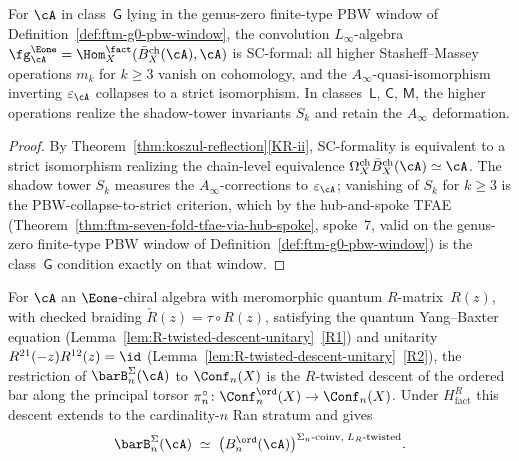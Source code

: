 \begin{corollary}
\label{cor:eight-cor-sc-formality}
For $\cA$ in class~$\mathsf{G}$ lying in the genus-zero finite-type
PBW window of Definition~\ref{def:ftm-g0-pbw-window}, the convolution
$L_\infty$-algebra
$\fg^{\Eone}_\cA=\Hom^{\fact}_X(\Bbarch_X(\cA),\cA)$ is SC-formal: all
higher Stasheff--Massey operations $m_k$ for $k\geq 3$ vanish on
cohomology, and the $A_\infty$-quasi-isomorphism inverting
$\varepsilon_\cA$ collapses to a strict isomorphism.  In
classes~$\mathsf{L}$, $\mathsf{C}$, $\mathsf{M}$, the higher
operations realize the shadow-tower invariants $S_k$ and retain the
$A_\infty$ deformation.
\end{corollary}

\begin{proof}
By Theorem~\ref{thm:koszul-reflection}\ref{KR-ii}, SC-formality is
equivalent to a strict isomorphism realizing the chain-level
equivalence $\Omegach_X\Bbarch_X(\cA)\simeq\cA$.
The shadow tower $S_k$ measures the $A_\infty$-corrections to
$\varepsilon_\cA$; vanishing of $S_k$ for $k\geq 3$ is the
PBW-collapse-to-strict criterion, which by the hub-and-spoke TFAE
(Theorem~\ref{thm:ftm-seven-fold-tfae-via-hub-spoke}, spoke~7, valid
on the genus-zero finite-type PBW window of
Definition~\ref{def:ftm-g0-pbw-window}) is the
class~$\mathsf{G}$ condition exactly on that window.
\end{proof}

\begin{corollary}
\label{cor:eight-cor-R-descent}
For $\cA$ an $\Eone$-chiral algebra with meromorphic quantum
$R$-matrix~$R(z)$, with checked braiding
$\check R(z)=\tau\circ R(z)$, satisfying the quantum Yang--Baxter
equation (Lemma~\ref{lem:R-twisted-descent-unitary}~\ref{R1}) and unitarity
$R^{21}(-z)R^{12}(z)=\id$
(Lemma~\ref{lem:R-twisted-descent-unitary}~\ref{R2}), the restriction of
$\barB^{\Sigma}_n(\cA)$ to $\Conf_n(X)$ is the $R$-twisted descent of
the ordered bar along the principal torsor
$\pi_n^\circ\colon\Conf_n^{\ord}(X)\to\Conf_n(X)$.  Under
$H_{\mathrm{fact}}^{R}$ this descent extends to the cardinality-$n$
Ran stratum and gives
\[
\barB^{\Sigma}_n(\cA)\;\simeq\;
\bigl(B^{\ord}_n(\cA)\bigr)^{\Sigma_n\text{-coinv},\;L_R\text{-twisted}}.
\]
\end{corollary}

